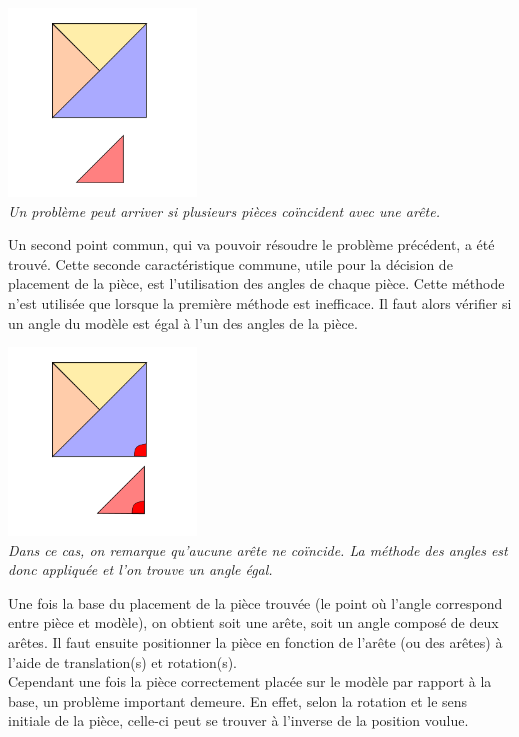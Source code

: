 \documentclass[a4paper, 11pt]{report}
\begin{document}
    \begin{center}
    \includegraphics[width=5cm]{place_figure_probleme_exacte_match}\\
    \emph{Un problème peut arriver si plusieurs pièces coïncident avec une arête.}\\
    \end{center}

    Un second point commun, qui va pouvoir résoudre le problème précédent, a été trouvé. Cette seconde caractéristique commune, utile pour la décision de placement de la pièce, est l'utilisation des angles de chaque pièce. Cette méthode n'est utilisée que lorsque la première méthode est inefficace. Il faut alors vérifier si un angle du modèle est égal à l'un des angles de la pièce. 

    \begin{center}
    \includegraphics[width=5cm]{place_figure_probleme_angle_match}\\
    \emph{Dans ce cas, on remarque qu'aucune arête ne coïncide. La méthode des angles est donc appliquée et l'on trouve un angle égal.}\\
    \end{center}

    Une fois la base du placement de la pièce trouvée (le point où l'angle correspond entre pièce et modèle), on obtient soit une arête, soit un angle composé de deux arêtes. Il faut ensuite positionner la pièce en fonction de l'arête (ou des arêtes) à l'aide de translation(s) et rotation(s).\\
    Cependant une fois la pièce correctement placée sur le modèle par rapport à la base, un problème important demeure. En effet, selon la rotation et le sens initiale de la pièce, celle-ci peut se trouver à l'inverse de la position voulue. 
\end{document}
